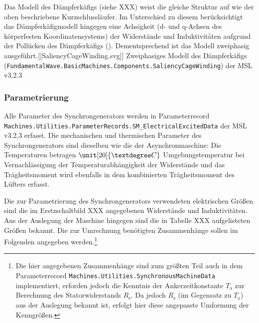 Das Modell des Dämpferkäfigs (siehe XXX) weist die gleiche Struktur auf
wie der oben beschriebene Kurzschlussläufer. Im Unterschied zu diesem
berücksichtigt das Dämpferkäfigmodell hingegen eine Achsigkeit (d- und
q-Achsen des körperfesten Koordinatensystems) der Widerstände und
Induktivitäten aufgrund der Pollücken des Dämpferkäfigs
(\cite[S. 194]{kralModelicaObjektorientierteModellbildung2019}).
Dementsprechend ist das Modell zweiphasig
ausgeführt.{[}{[}SaliencyCageWinding.svg{]}{]} Zweiphasiges Modell des
Dämpferkäfigs
(\texttt{FundamentalWave.BasicMachines.Components.SaliencyCageWinding})
der MSL v3.2.3

\hypertarget{parametrierung-1}{%
\subsubsection{Parametrierung}\label{parametrierung-1}}

Alle Parameter des Synchrongenerators werden in Parameterrecord
\texttt{Machines.Utilities.ParameterRecords.SM\_ElectricalExcitedData}
der MSL v3.2.3 erfasst. Die mechanischen und thermischen Parameter des
Synchrongenerators sind dieselben wie die der Asynchronmaschine: Die
Temperaturen betragen \(\unit[20]{°C}\) Umgebungstemperatur bei
Vernachlässigung der Temperaturabhängigkeit der Widerstände und das
Trägheitsmoment wird ebenfalls in dem kombinierten Trägheitsmoment des
Lüfters erfasst.

Die zur Parametrierung des Synchrongenerators verwendeten elektrischen
Größen sind die im Erstzschaltbild XXX angegebenen Widerstände und
Induktivitäten. Aus der Auslegung der Maschine hingegen sind die in
Tabelle XXX aufgelisteten Größen bekannt. Die zur Umrechnung benötigten
Zusammenhänge sollen im Folgenden angegeben werden.\footnote{Die hier
  angegebenen Zusammenhänge sind zum größten Teil auch in dem
  Parameterrecord \texttt{Machines.Utilities.SynchronousMachineData}
  implementiert, erforden jedoch die Kenntnis der Ankerzeitkonstante
  \(T_{\mathrm{a}}\) zur Berechnung des Statorwiderstands
  \(R_{\mathrm{s}}\). Da jedoch \(R_{\mathrm{s}}\) (im Gegensatz zu
  \(T_{\mathrm{a}}\)) aus der Auslegung bekannt ist, erfolgt hier diese
  angepasste Umformung der Kenngrößen.}


